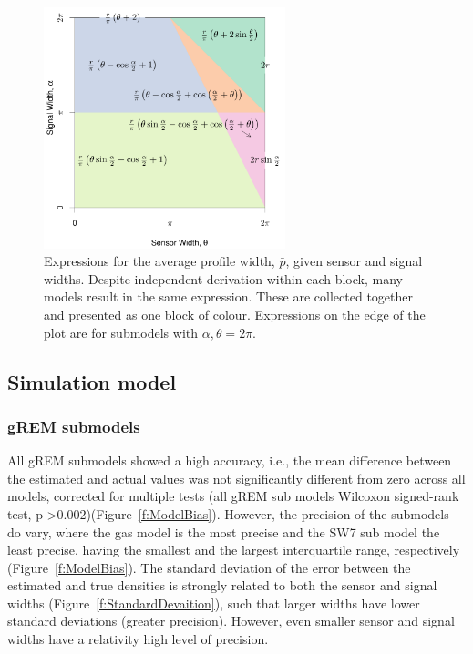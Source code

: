 \documentclass[a4paper,10pt,reqno,oneside]{amsart}
\begin{document}
\begin{figure}
	\centering
	\includegraphics[width=7cm]{imgs/equalModelResults.pdf}
	\caption{Expressions for the average profile width, $\bar{p}$, given sensor and signal widths. Despite independent derivation within each block, many models result in the same expression. These are collected together and presented as one block of colour. Expressions on the edge of the plot are for submodels with $\alpha, \theta = 2\pi$. }
	\label{f:equalModelResults}
\end{figure}



\subsection*{Simulation model}

\subsubsection*{gREM submodels}
All gREM submodels showed a high accuracy, i.e., the mean difference between the estimated and actual values was not significantly different from zero across all models, corrected for multiple tests (all gREM sub models Wilcoxon signed-rank test, p \textgreater 0.002)(Figure~\ref{f:ModelBias}). However, the precision of the submodels do vary, where the gas model is the most precise and the SW7 sub model the least precise, having the smallest and the largest interquartile range, respectively (Figure~\ref{f:ModelBias}). The standard deviation of the error between the estimated and true densities is strongly related to both the sensor and signal widths (Figure~\ref{f:StandardDevaition}), such that larger widths have lower standard deviations (greater precision). However, even smaller sensor and signal widths have a relativity high level of precision. 
\end{document}
